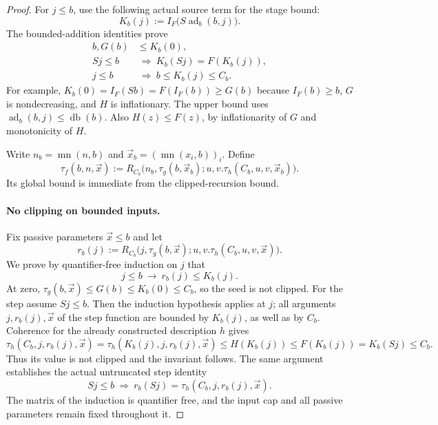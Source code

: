 \begin{proof}
For $j\leq b$, use the following actual source term for the stage bound:
\[
                 K_b(j):=I_F\bigl(S\operatorname{ad}_b(b,j)\bigr).
 \tag{Stage bound}\label{eq:ib-stage-bound}
\]
The bounded-addition identities prove
\begin{align}
 b,G(b)&\leq K_b(0),\label{eq:ib-Kbase}\\
 Sj\leq b&\ \Longrightarrow\ K_b(Sj)=F(K_b(j)),
 \label{eq:ib-Kstep}\\
 j\leq b&\ \Longrightarrow\ b\leq K_b(j)\leq C_b.
 \label{eq:ib-Kcap}
\end{align}
For example, $K_b(0)=I_F(Sb)=F(I_F(b))\geq G(b)$ because
$I_F(b)\geq b$, $G$ is nondecreasing, and $H$ is inflationary.
The upper bound uses $\operatorname{ad}_b(b,j)\leq\operatorname{db}(b)$.
Also $H(z)\leq F(z)$, by inflationarity of $G$ and monotonicity of $H$.

Write $n_b=\operatorname{mn}(n,b)$ and
$\vec x_b=(\operatorname{mn}(x_i,b))_i$.  Define
\[
 \tau_f(b,n,\vec x):=
 R_{C_b}\bigl(n_b,\tau_g(b,\vec x_b);
       u,v.\tau_h(C_b,u,v,\vec x_b)\bigr).
 \tag{Compiled recursion}\label{eq:ib-compiled-recursion}
\]
Its global bound is immediate from the clipped-recursion bound.

\paragraph{No clipping on bounded inputs.}
Fix passive parameters $\vec x\leq b$ and let
\[
 r_b(j):=R_{C_b}\bigl(j,\tau_g(b,\vec x);
                u,v.\tau_h(C_b,u,v,\vec x)\bigr).
\]
We prove by quantifier-free induction on $j$ that
\[
                       j\leq b\ \longrightarrow\ r_b(j)\leq K_b(j).
 \tag{Invariant}\label{eq:ib-growth-invariant}
\]
At zero, $\tau_g(b,\vec x)\leq G(b)\leq K_b(0)\leq C_b$,
so the seed is not clipped.  For the step assume $Sj\leq b$.
Then the induction hypothesis applies at $j$; all arguments
$j,r_b(j),\vec x$ of the step function are bounded by $K_b(j)$,
as well as by $C_b$.  Coherence for the already constructed description
$h$ gives
\[
 \tau_h(C_b,j,r_b(j),\vec x)
 =\tau_h(K_b(j),j,r_b(j),\vec x)
 \leq H(K_b(j))\leq F(K_b(j))=K_b(Sj)\leq C_b.
\]
Thus its value is not clipped and the invariant follows.  The same
argument establishes the actual untruncated step identity
\[
 Sj\leq b\ \Longrightarrow\
 r_b(Sj)=\tau_h(C_b,j,r_b(j),\vec x).
 \tag{Unclipped step}\label{eq:ib-unclipped-step}
\]
The matrix of the induction is quantifier free, and the input cap and
all passive parameters remain fixed throughout it.


\end{proof}
